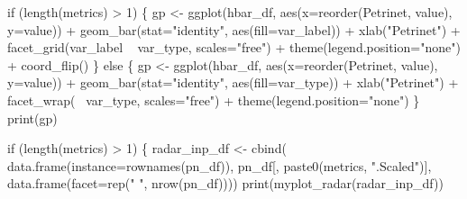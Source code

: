 \documentclass[]{article}
\newenvironment{Shaded}{\begin{snugshade}}{\end{snugshade}}
\newcommand{\KeywordTok}[1]{\textcolor[rgb]{0.94,0.87,0.69}{{#1}}}
\newcommand{\DataTypeTok}[1]{\textcolor[rgb]{0.87,0.87,0.75}{{#1}}}
\newcommand{\DecValTok}[1]{\textcolor[rgb]{0.86,0.86,0.80}{{#1}}}
\newcommand{\StringTok}[1]{\textcolor[rgb]{0.80,0.58,0.58}{{#1}}}
\newcommand{\NormalTok}[1]{\textcolor[rgb]{0.80,0.80,0.80}{{#1}}}
\begin{document}
\begin{Shaded}
\begin{Highlighting}[]
    \NormalTok{if (}\KeywordTok{length}\NormalTok{(metrics) >}\StringTok{ }\DecValTok{1}\NormalTok{) \{}
        \NormalTok{gp <-}\StringTok{ }\KeywordTok{ggplot}\NormalTok{(hbar_df, }\KeywordTok{aes}\NormalTok{(}\DataTypeTok{x=}\KeywordTok{reorder}\NormalTok{(Petrinet, value), }\DataTypeTok{y=}\NormalTok{value)) +}\StringTok{       }
\StringTok{                }\KeywordTok{geom_bar}\NormalTok{(}\DataTypeTok{stat=}\StringTok{"identity"}\NormalTok{, }\KeywordTok{aes}\NormalTok{(}\DataTypeTok{fill=}\NormalTok{var_label)) +}\StringTok{ }\KeywordTok{xlab}\NormalTok{(}\StringTok{"Petrinet"}\NormalTok{) +}\StringTok{ }
\StringTok{                }\KeywordTok{facet_grid}\NormalTok{(var_label ~}\StringTok{ }\NormalTok{var_type, }\DataTypeTok{scales=}\StringTok{"free"}\NormalTok{) +}\StringTok{         }
\StringTok{                }\KeywordTok{theme}\NormalTok{(}\DataTypeTok{legend.position=}\StringTok{"none"}\NormalTok{) +}\StringTok{ }\KeywordTok{coord_flip}\NormalTok{()}
    \NormalTok{\} else \{}
        \NormalTok{gp <-}\StringTok{ }\KeywordTok{ggplot}\NormalTok{(hbar_df, }\KeywordTok{aes}\NormalTok{(}\DataTypeTok{x=}\KeywordTok{reorder}\NormalTok{(Petrinet, value), }\DataTypeTok{y=}\NormalTok{value)) +}\StringTok{       }
\StringTok{                }\KeywordTok{geom_bar}\NormalTok{(}\DataTypeTok{stat=}\StringTok{"identity"}\NormalTok{, }\KeywordTok{aes}\NormalTok{(}\DataTypeTok{fill=}\NormalTok{var_type)) +}\StringTok{ }\KeywordTok{xlab}\NormalTok{(}\StringTok{"Petrinet"}\NormalTok{) +}\StringTok{ }
\StringTok{                }\KeywordTok{facet_wrap}\NormalTok{(~}\StringTok{ }\NormalTok{var_type, }\DataTypeTok{scales=}\StringTok{"free"}\NormalTok{) +}\StringTok{         }
\StringTok{                }\KeywordTok{theme}\NormalTok{(}\DataTypeTok{legend.position=}\StringTok{"none"}\NormalTok{)}
    \NormalTok{\}}
    \KeywordTok{print}\NormalTok{(gp)}

    \NormalTok{if (}\KeywordTok{length}\NormalTok{(metrics) >}\StringTok{ }\DecValTok{1}\NormalTok{) \{}
        \NormalTok{radar_inp_df <-}\StringTok{ }\KeywordTok{cbind}\NormalTok{( }\KeywordTok{data.frame}\NormalTok{(}\DataTypeTok{instance=}\KeywordTok{rownames}\NormalTok{(pn_df)),}
                                        \NormalTok{pn_df[, }\KeywordTok{paste0}\NormalTok{(metrics, }\StringTok{".Scaled"}\NormalTok{)],}
                                        \KeywordTok{data.frame}\NormalTok{(}\DataTypeTok{facet=}\KeywordTok{rep}\NormalTok{(}\StringTok{" "}\NormalTok{, }\KeywordTok{nrow}\NormalTok{(pn_df))))}
        \KeywordTok{print}\NormalTok{(}\KeywordTok{myplot_radar}\NormalTok{(radar_inp_df))}


\end{Highlighting}
\end{Shaded}
\end{document}

